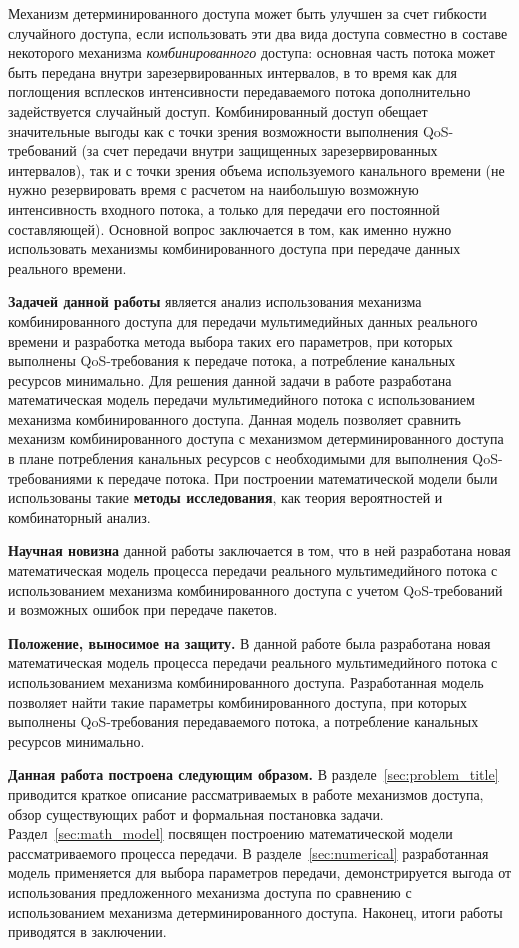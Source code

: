 Механизм детерминированного доступа может быть улучшен за счет гибкости случайного доступа,  если использовать эти два вида доступа совместно в составе некоторого механизма \textit{комбинированного} доступа: основная часть потока может быть передана внутри зарезервированных интервалов, в то время как для поглощения всплесков интенсивности передаваемого потока дополнительно задействуется случайный доступ. Комбинированный доступ обещает значительные выгоды как с точки зрения возможности выполнения QoS-требований (за счет передачи внутри защищенных зарезервированных интервалов), так и с точки зрения объема используемого канального времени (не нужно резервировать время с расчетом на наибольшую возможную интенсивность входного потока, а только для передачи его постоянной составляющей). Основной вопрос заключается в том, как именно нужно использовать механизмы комбинированного доступа при передаче данных реального времени.
 
\textbf{Задачей данной работы} является анализ использования механизма комбинированного доступа для передачи мультимедийных данных реального времени и разработка метода выбора таких его параметров, при которых выполнены QoS-требования к передаче потока, а потребление канальных ресурсов минимально. Для решения данной задачи в работе разработана математическая модель передачи мультимедийного потока с использованием  механизма комбинированного доступа. Данная модель позволяет сравнить механизм комбинированного доступа с механизмом детерминированного доступа в плане потребления канальных ресурсов с необходимыми для выполнения QoS-требованиями к передаче потока. При построении математической модели были использованы такие \textbf{методы исследования}, как теория вероятностей и комбинаторный анализ.    

\textbf{Научная новизна} данной работы заключается в том, что в ней разработана новая математическая модель процесса передачи реального мультимедийного потока с использованием механизма комбинированного доступа с учетом QoS-требований и возможных ошибок при передаче пакетов.

\textbf{Положение, выносимое на защиту.} В данной работе была разработана новая математическая модель процесса передачи реального мультимедийного потока с использованием механизма комбинированного доступа. Разработанная модель позволяет найти такие параметры комбинированного доступа, при которых выполнены QoS-требования передаваемого потока, а потребление канальных ресурсов минимально.

\textbf{Данная работа построена следующим образом.} В разделе~\ref{sec:problem_title} приводится краткое описание рассматриваемых в работе механизмов доступа, обзор существующих работ и  формальная постановка задачи. Раздел~\ref{sec:math_model} посвящен построению математической модели рассматриваемого процесса передачи. В разделе~\ref{sec:numerical} разработанная модель применяется для выбора параметров передачи, демонстрируется выгода от использования предложенного механизма доступа по сравнению с использованием механизма детерминированного доступа. Наконец, итоги работы приводятся в заключении.